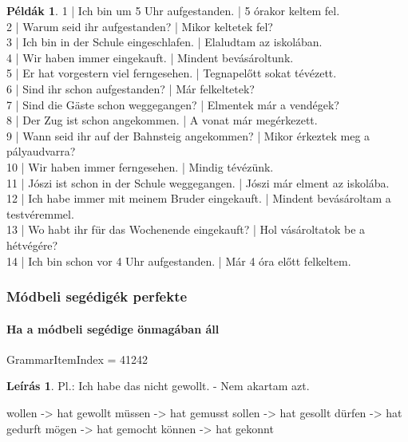 \documentclass{article}
\theoremstyle{definition}
\newtheorem*{exmp}{Példák}
\newtheorem*{desc}{Leírás}
\begin{document}
\begin{exmp}
1 | Ich bin um 5 Uhr aufgestanden. | 5 órakor keltem fel.\\
2 | Warum seid ihr aufgestanden? | Mikor keltetek fel?\\
3 | Ich bin in der Schule eingeschlafen. | Elaludtam az iskolában.\\
4 | Wir haben immer eingekauft. | Mindent bevásároltunk.\\
5 | Er hat vorgestern viel ferngesehen. | Tegnapelőtt sokat tévézett.\\
6 | Sind ihr schon aufgestanden? | Már felkeltetek?\\
7 | Sind die Gäste schon weggegangen? | Elmentek már a vendégek?\\
8 | Der Zug ist schon angekommen. | A vonat már megérkezett.\\
9 | Wann seid ihr auf der Bahnsteig angekommen? | Mikor érkeztek meg a pályaudvarra?\\
10 | Wir haben immer ferngesehen. | Mindig tévézünk.\\
11 | Jószi ist schon in der Schule weggegangen. | Jószi már elment az iskolába.\\
12 | Ich habe immer mit meinem Bruder eingekauft. | Mindent bevásároltam a testvéremmel.\\
13 | Wo habt ihr für das Wochenende eingekauft? | Hol vásároltatok be a hétvégére?\\
14 | Ich bin schon vor 4 Uhr aufgestanden. | Már 4 óra előtt felkeltem.\\
\end{exmp}

\subsubsection{Módbeli segédigék perfekte}

\paragraph{Ha a módbeli segédige önmagában áll}

GrammarItemIndex = 41242

\begin{desc}
Pl.: Ich habe das nicht gewollt. - Nem akartam azt.

wollen -> hat gewollt
müssen -> hat gemusst
sollen -> hat gesollt
dürfen -> hat gedurft
mögen -> hat gemocht
können -> hat gekonnt
\end{desc}
\end{document}
